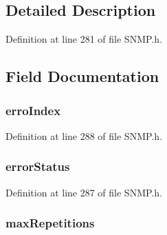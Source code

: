 \subsection{Detailed Description}


Definition at line 281 of file S\+N\+M\+P.\+h.



\subsection{Field Documentation}
\hypertarget{struct_p_d_u___i_n_f_o_a3b65c69b517f5a0ce9f9fdd58c43755e}{}
\subsubsection[{erro\+Index}]{ erro\+Index}\label{struct_p_d_u___i_n_f_o_a3b65c69b517f5a0ce9f9fdd58c43755e}


Definition at line 288 of file S\+N\+M\+P.\+h.

\hypertarget{struct_p_d_u___i_n_f_o_ad62a4b671c84af2175a8ced889bc4eed}{}
\subsubsection[{error\+Status}]{ error\+Status}\label{struct_p_d_u___i_n_f_o_ad62a4b671c84af2175a8ced889bc4eed}


Definition at line 287 of file S\+N\+M\+P.\+h.

\hypertarget{struct_p_d_u___i_n_f_o_a3101f6b3570815526a73d81dd9f5007a}{}
\subsubsection[{max\+Repetitions}]{ max\+Repetitions}\label{struct_p_d_u___i_n_f_o_a3101f6b3570815526a73d81dd9f5007a}


